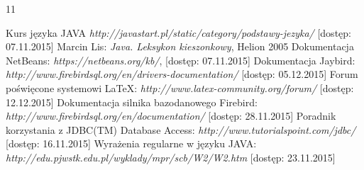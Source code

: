 

\raggedright

\setcounter{secnumdepth}{-1}
\begin {thebibliography}{11} 

 Kurs języka JAVA  \emph{http://javastart.pl/static/category/podstawy-jezyka/} [dostęp: 07.11.2015]
\vspace{1.21em}
 Marcin Lis: \emph{Java. Leksykon kieszonkowy}, Helion 2005
\vspace{1.21em}
 Dokumentacja NetBeans: \emph{https://netbeans.org/kb/}, [dostęp: 07.11.2015]
\vspace{1.21em}
 Dokumentacja Jaybird: \emph{http://www.firebirdsql.org/en/drivers-documentation/} [dostęp: 05.12.2015]
\vspace{1.21em}
 Forum poświęcone systemowi LaTeX: \emph{http://www.latex-community.org/forum/} [dostęp: 12.12.2015]
\vspace{1.21em}
 Dokumentacja silnika bazodanowego Firebird: \emph{http://www.firebirdsql.org/en/documentation/} [dostęp: 28.11.2015]
\vspace{1.21em}
 Poradnik korzystania z JDBC(TM) Database Access: \emph{http://www.tutorialspoint.com/jdbc/} [dostęp: 16.11.2015]
\vspace{1.21em}
 Wyrażenia regularne w języku JAVA: \emph{http://edu.pjwstk.edu.pl/wyklady/mpr/scb/W2/W2.htm} [dostęp: 23.11.2015]
\end {thebibliography}

